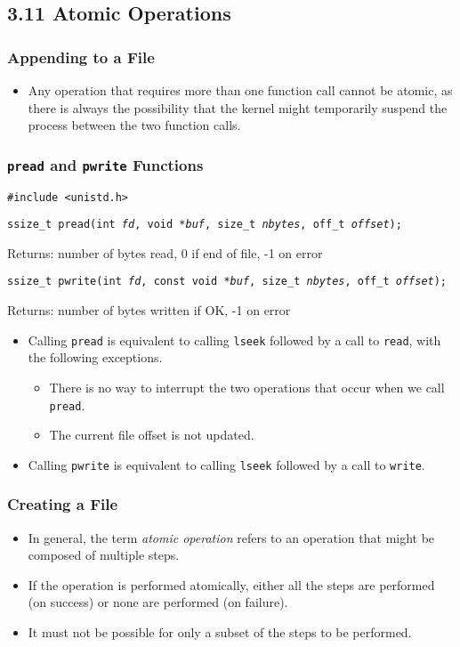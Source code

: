 \documentclass[]{article}
\newcommand{\code}{\texttt}
\begin{document}
\subsection*{3.11 Atomic Operations}
\subsubsection*{Appending to a File}
\begin{itemize}
\item Any operation that requires more than one function call cannot be atomic,
as there is always the possibility that the kernel might temporarily suspend the
process between the two function calls.
\end{itemize}

\subsubsection*{\code{pread} and \code{pwrite} Functions}
\code{\#include <unistd.h>}

\code{ssize\_t pread(int \emph{fd}, void *\emph{buf}, size\_t \emph{nbytes},
off\_t \emph{offset});}

Returns: number of bytes read, 0 if end of file, -1 on error

\code{ssize\_t pwrite(int \emph{fd}, const void *\emph{buf}, size\_t
\emph{nbytes}, off\_t \emph{offset});}

Returns: number of bytes written if OK, -1 on error

\begin{itemize}
\item Calling \code{pread} is equivalent to calling \code{lseek} followed by a
call to \code{read}, with the following exceptions.
\begin{itemize}
\item There is no way to interrupt the two operations that occur when we call
\code{pread}.
\item The current file offset is not updated.
\end{itemize}
\item Calling \code{pwrite} is equivalent to calling \code{lseek} followed by a
call to \code{write}.
\end{itemize}

\subsubsection*{Creating a File}
\begin{itemize}
\item In general, the term \emph{atomic operation} refers to an operation that
might be composed of multiple steps.
\item If the operation is performed atomically, either all the steps are
performed (on success) or none are performed (on failure).
\item It must not be possible for only a subset of the steps to be performed.
\end{itemize}
\end{document}
